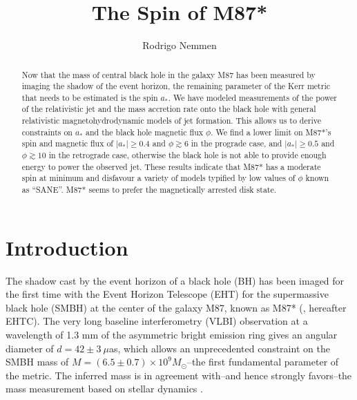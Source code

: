 \documentclass[twocolumn, linenumbers]{aastex62} %
\begin{document}
\title{The Spin of M87*}




\author{Rodrigo Nemmen}
\nocollaboration




\begin{abstract}
Now that the mass of central black hole in the galaxy M87 has been measured by imaging the shadow of the event horizon, the remaining parameter of the Kerr metric that needs to be estimated is the spin $a_*$. We have modeled measurements of the power of the relativistic jet and the mass accretion rate onto the black hole with general relativistic magnetohydrodynamic models of jet formation. This allows us to derive constraints on $a_*$ and the black hole magnetic flux $\phi$. We find a lower limit on M87*'s spin and magnetic flux of $|a_*| \geq 0.4$ and $\phi \gtrsim 6$ in the prograde case, and $|a_*| \geq 0.5$ and $\phi \gtrsim 10$ in the retrograde case, otherwise the black hole is not able to provide enough energy to power the observed jet. These results indicate that M87* has a moderate spin at minimum and disfavour a variety of models typified by low values of $\phi$ known as ``SANE''. M87* seems to prefer the magnetically arrested disk state. 
\end{abstract}






\section{Introduction} \label{sec:intro}

The shadow cast by the event horizon of a black hole (BH) has been imaged for the first time with the Event Horizon Telescope (EHT) for the supermassive black hole (SMBH) at the center of the galaxy M87, known as M87* (\citealt{EHTC2019}, hereafter EHTC). The very long baseline interferometry (VLBI) observation at a wavelength of 1.3 mm of the asymmetric bright emission ring gives an angular diameter of $d=42 \pm 3 \ \mu$as, which allows an unprecedented constraint on the SMBH mass of $M=(6.5 \pm 0.7) \times 10^9 M_\odot$--the first fundamental parameter of the \cite{Kerr1963} metric. The inferred mass is in agreement with--and hence strongly favors--the mass measurement based on stellar dynamics \citep{Gebhardt2011}. 
\end{document}
